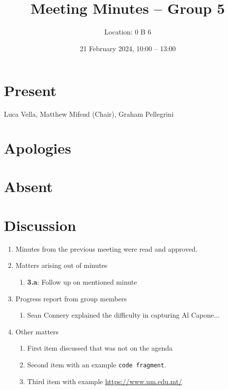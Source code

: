 \documentclass{cce2014-meetings}
\title{Meeting Minutes -- Group 5}
\author{Location: 0 B 6}
\date{21 February 2024, 10:00 -- 13:00}
\begin{document}
\maketitle

\section*{Present}
Luca Vella,
Matthew Mifsud (Chair),
Graham Pellegrini

\section*{Apologies}

\section*{Absent}

\section*{Discussion}

\begin{enumerate}


\item Minutes from the previous meeting were read and approved.

\item Matters arising out of minutes
   \begin{enumerate}
   \item \textbf{3.a}: Follow up on mentioned minute
   \end{enumerate}

\item Progress report from group members
   \begin{enumerate}
   \item Sean Connery explained the difficulty in capturing Al Capone...
   \end{enumerate}


\item Other matters
   \begin{enumerate}
   \item First item discussed that was not on the agenda
   \item Second item with an example \verb|code fragment|.
   \item Third item with example \url{https://www.um.edu.mt/}
   \end{enumerate}

\end{enumerate}
\end{document}
